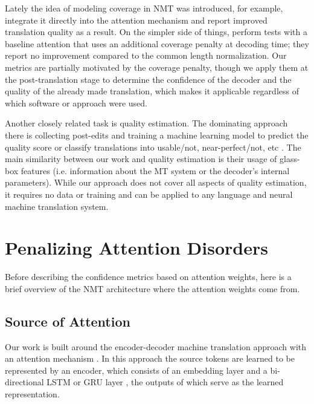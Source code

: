 \documentclass[]{article}
\begin{document}
Lately the idea of modeling coverage in NMT was introduced, for example, \citet{modelling-coverage} integrate it directly into the attention mechanism and report improved translation quality as a result. On the simpler side of things, \citet{bridgingGoogle} perform tests with a baseline attention that uses an additional coverage penalty at decoding time; they report no improvement compared to the common length normalization. Our metrics are partially motivated by the coverage penalty, though we apply them at the post-translation stage to determine the confidence of the decoder and the quality of the already made translation, which makes it applicable regardless of which software or approach were used.


Another closely related task is quality estimation. The dominating approach there is collecting post-edits and training a machine learning model to predict the quality score or classify translations into usable/not, near-perfect/not, etc \citep{quality-estimation, quality-estimation-ml}. The main similarity between our work and quality estimation is their usage of glass-box features (i.e. information about the MT system or the decoder's internal parameters). While our approach does not cover all aspects of quality estimation, it requires no data or training and can be applied to any language and neural machine translation system.








\section{Penalizing Attention Disorders}
\label{sctScoring}

Before describing the confidence metrics based on attention weights, here is a brief overview of the NMT architecture where the attention weights come from.

\subsection{Source of Attention}

Our work is built around the encoder-decoder machine translation approach \citep{sutskever2014sequence,cho-EtAl:2014:EMNLP2014} with an attention mechanism \citep{DBLP:journals/corr/BahdanauCB14}. In this approach the source tokens are learned to be represented by an encoder, which consists of an embedding layer and a bi-directional LSTM or GRU layer \citep[or 8,][]{bridgingGoogle}, the outputs of which serve as the learned representation.
\end{document}
